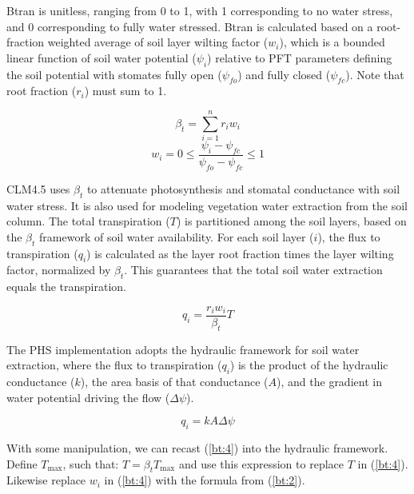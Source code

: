 \documentclass[draft,linenumbers]{agujournal}
\begin{document}
    Btran is unitless, ranging from 0 to 1, with 1 corresponding to no water stress, and 0 corresponding to fully water stressed. 
    Btran is calculated based on a root-fraction weighted average of soil layer wilting factor ($w_i$), which is a bounded linear 
    function of soil water potential ($\psi_i$) relative to PFT parameters defining the soil potential with stomates fully open ($
    \psi_{fo}$) and fully closed ($\psi_{fc}$). Note that root fraction ($r_i$) must sum to 1.
    
    \begin{linenomath*}
    \begin{equation} \beta_t = \sum_{i=1}^{n}{r_iw_i}
    \end{equation}
    \begin{equation} 
    \label{bt:2}
    w_i=0 \leq \dfrac{\psi_i-\psi_{fc}}{\psi_{fo}-\psi_{fc}} \leq 1
    \end{equation}
    \end{linenomath*}
    
    CLM4.5 uses $\beta_t$ to attenuate photosynthesis and stomatal conductance with soil water stress. It is also used for 
    modeling vegetation water extraction from the soil column. The total transpiration ($T$) is partitioned among the soil layers, 
    based on the $\beta_t$ framework of soil water availability. For each soil layer ($i$), the flux to transpiration ($q_i$) is 
    calculated as the layer root fraction times the layer wilting factor, normalized by $\beta_t$. This guarantees that the total 
    soil water extraction equals the transpiration.
    \begin{linenomath*}
    \begin{equation}
    \label{bt:4}
    q_i = \dfrac{r_i w_i}{\beta_t}T
    \end{equation}
    \end{linenomath*}
    
    The PHS implementation adopts the hydraulic framework for soil water extraction, where the flux to transpiration ($q_i$) is 
    the product of the hydraulic conductance ($k$), the area basis of that conductance ($A$), and the gradient in water 
    potential driving the flow ($\Delta\psi$).
    \begin{linenomath*}
    \begin{equation}
    q_i = kA\Delta\psi
    \end{equation}
    \end{linenomath*}
    
    With some manipulation, we can recast (\ref{bt:4}) into the hydraulic framework. Define $T_{\text{max}}$, such that: $T = 
    \beta_t T_{\text{max}}$ and use this expression to replace $T$ in (\ref{bt:4}).  Likewise replace $w_i$ in (\ref{bt:4}) with the 
    formula from (\ref{bt:2}).
    
\end{document}
